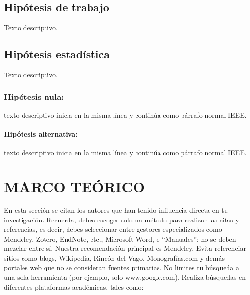     \subsection{Hipótesis de trabajo}

    Texto descriptivo.

    \subsection{Hipótesis estadística}

    Texto descriptivo.
    
        \subsubsection{Hipótesis nula:}
texto descriptivo inicia en la misma línea y continúa como párrafo normal IEEE.

        \paragraph{Hipótesis alternativa:}
texto descriptivo inicia en la misma línea y continúa como párrafo normal IEEE.
        

\newpage
\section{MARCO TEÓRICO}

En esta sección se citan los autores que han tenido influencia directa en tu investigación. Recuerda, debes escoger solo un método para realizar las citas y referencias, es decir, debes seleccionar entre gestores especializados como Mendeley, Zotero, EndNote, etc., Microsoft Word, o “Manuales”; no se deben mezclar entre sí. Nuestra recomendación principal es Mendeley. Evita referenciar sitios como blogs, Wikipedia, Rincón del Vago, Monografías.com y demás portales web que no se consideran fuentes primarias. No limites tu búsqueda a una sola herramienta (por ejemplo, solo www.google.com). Realiza búsquedas en diferentes plataformas académicas, tales como:

